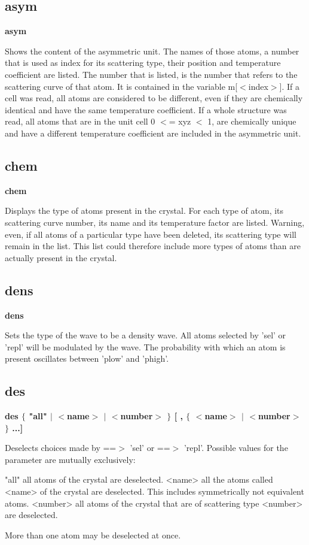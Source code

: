 \subsection*{asym}
{\bf asym \par }
\par
\vspace{3pt}
Shows the content of the asymmetric unit. The names of those atoms, 
a number that is used as index for its scattering type, their position 
and temperature coefficient are listed. The number that is listed, 
is the number that refers to the scattering curve of that atom. It is 
contained in the variable m[$ <$index$> $]. If a cell was read, all atoms 
are considered to be different, even if they are chemically identical 
and have the same temperature coefficient. If a whole structure was 
read, all atoms that are in the unit cell 0 $ <$= xyz $ <$ 1, are chemically 
unique and have a different temperature coefficient are included in 
the asymmetric unit. 
\subsection*{chem}
{\bf chem \par }
\par
\vspace{3pt}
Displays the type of atoms present in the crystal. For each type of 
atom, its scattering curve number, its name and its temperature 
factor are listed. 
Warning, even, if all atoms of a particular type have been deleted, its 
scattering type will remain in the list. This list could therefore 
include more types of atoms than are actually present in the crystal. 
\subsection*{dens}
{\bf dens \par }
\par
\vspace{3pt}
Sets the type of the wave to be a density wave. All atoms selected 
by 'sel' or 'repl' will be modulated by the wave. The probability 
with which an atom is present oscillates between 'plow' and 'phigh'. 
\subsection*{des}
{\bf des $ \{$ "all" $| $ $ <$name$> $ $| $ $ <$number$> $ $\} $ [ , $ \{$ $ <$name$> $ $| $ $ <$number$> $ $\} $ ...] \par }
\par
\vspace{3pt}
Deselects choices made by ==$> $ 'sel' or ==$> $ 'repl'. Possible values 
for the parameter are mutually exclusively: 
\par
\begin{MacVerbatim}
"all"     all atoms of the crystal are deselected.
<name>    all the atoms called <name> of the crystal are deselected.
          This includes symmetrically not equivalent atoms.
<number>  all atoms of the crystal that are of scattering type <number>
          are deselected.
\end{MacVerbatim}
More than one atom may be deselected at once. 
